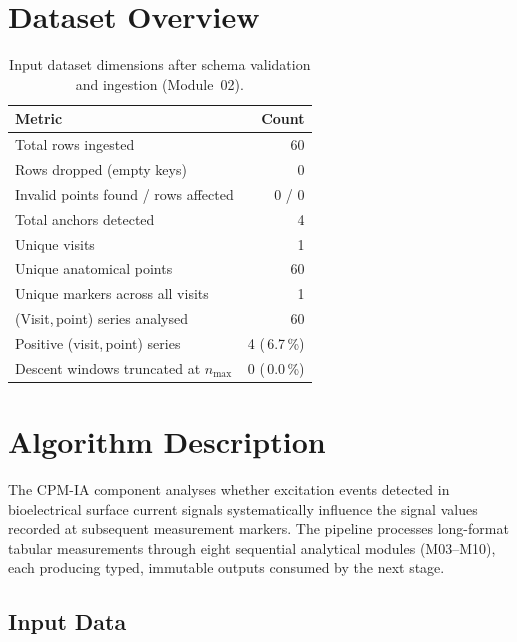 \documentclass[a4paper,11pt]{article}
\begin{document}
\section{Dataset Overview}

\begin{table}[h!]
\centering
\small
\caption{Input dataset dimensions after schema validation and ingestion (Module~02).}
\begin{tabular}{lr}
\toprule
\textbf{Metric} & \textbf{Count} \\
\midrule
Total rows ingested                        & 60 \\
Rows dropped (empty keys)                  & 0 \\
Invalid points found / rows affected       & 0 / 0 \\
Total anchors detected                     & 4 \\
Unique visits                          & 1 \\
Unique anatomical points               & 60 \\
Unique markers across all visits       & 1 \\
(Visit,\,point) series analysed        & 60 \\
Positive (visit,\,point) series        & 4 (\,6.7\,\%) \\
Descent windows truncated at $n_{\max}$ & 0 (\,0.0\,\%) \\
\bottomrule
\end{tabular}
\end{table}

\section{Algorithm Description}

The CPM-IA component analyses whether excitation events detected in bioelectrical surface
current signals systematically influence the signal values recorded at subsequent measurement
markers. The pipeline processes long-format tabular measurements through eight sequential
analytical modules (M03--M10), each producing typed, immutable outputs consumed by the next
stage.

\subsection{Input Data}
\end{document}
